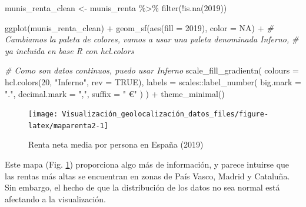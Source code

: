 \documentclass[
]{book}
\newenvironment{Shaded}{\begin{snugshade}}{\end{snugshade}}
\newcommand{\AttributeTok}[1]{\textcolor[rgb]{0.77,0.63,0.00}{#1}}
\newcommand{\CommentTok}[1]{\textcolor[rgb]{0.56,0.35,0.01}{\textit{#1}}}
\newcommand{\ConstantTok}[1]{\textcolor[rgb]{0.00,0.00,0.00}{#1}}
\newcommand{\DecValTok}[1]{\textcolor[rgb]{0.00,0.00,0.81}{#1}}
\newcommand{\FunctionTok}[1]{\textcolor[rgb]{0.00,0.00,0.00}{#1}}
\newcommand{\NormalTok}[1]{#1}
\newcommand{\OtherTok}[1]{\textcolor[rgb]{0.56,0.35,0.01}{#1}}
\newcommand{\SpecialCharTok}[1]{\textcolor[rgb]{0.00,0.00,0.00}{#1}}
\newcommand{\StringTok}[1]{\textcolor[rgb]{0.31,0.60,0.02}{#1}}
\theoremstyle{definition}
\theoremstyle{definition}
\theoremstyle{definition}
\theoremstyle{definition}
\theoremstyle{remark}
\begin{document}
\begin{Shaded}
\begin{Highlighting}[]

\NormalTok{munis\_renta\_clean }\OtherTok{\textless{}{-}}\NormalTok{ munis\_renta }\SpecialCharTok{\%\textgreater{}\%} \FunctionTok{filter}\NormalTok{(}\SpecialCharTok{!}\FunctionTok{is.na}\NormalTok{(}\StringTok{\textasciigrave{}}\AttributeTok{2019}\StringTok{\textasciigrave{}}\NormalTok{))}

\FunctionTok{ggplot}\NormalTok{(munis\_renta\_clean) }\SpecialCharTok{+}
  \FunctionTok{geom\_sf}\NormalTok{(}\FunctionTok{aes}\NormalTok{(}\AttributeTok{fill =} \StringTok{\textasciigrave{}}\AttributeTok{2019}\StringTok{\textasciigrave{}}\NormalTok{), }\AttributeTok{color =} \ConstantTok{NA}\NormalTok{) }\SpecialCharTok{+}
  \CommentTok{\# Cambiamos la paleta de colores, vamos a usar una paleta denominada Inferno,}
  \CommentTok{\# ya incluida en base R con hcl.colors}

  \CommentTok{\# Como son datos continuos, puedo usar Inferno}
  \FunctionTok{scale\_fill\_gradientn}\NormalTok{(}
    \AttributeTok{colours =} \FunctionTok{hcl.colors}\NormalTok{(}\DecValTok{20}\NormalTok{, }\StringTok{"Inferno"}\NormalTok{, }\AttributeTok{rev =} \ConstantTok{TRUE}\NormalTok{),}
    \AttributeTok{labels =}\NormalTok{ scales}\SpecialCharTok{::}\FunctionTok{label\_number}\NormalTok{(}
      \AttributeTok{big.mark =} \StringTok{"."}\NormalTok{,}
      \AttributeTok{decimal.mark =} \StringTok{","}\NormalTok{,}
      \AttributeTok{suffix =} \StringTok{" €"}
\NormalTok{    )}
\NormalTok{  ) }\SpecialCharTok{+}
  \FunctionTok{theme\_minimal}\NormalTok{()}
\end{Highlighting}
\end{Shaded}

\begin{figure}

{\centering \texttt{[image: Visualización\_geolocalización\_datos\_files/figure-latex/maparenta2-1]} 

}

\caption{Renta neta media por persona en España (2019)}\label{fig:maparenta2}
\end{figure}

Este mapa (Fig. \ref{fig:maparenta2}) proporciona algo más de información, y
parece intuirse que las rentas más altas se encuentran en zonas de País Vasco,
Madrid y Cataluña. Sin embargo, el hecho de que la distribución de los datos no
sea normal está afectando a la visualización.
\end{document}
